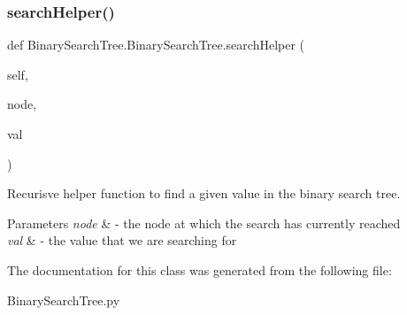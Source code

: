 \subsubsection{\texorpdfstring{search\+Helper()}{searchHelper()}}
{\footnotesize\ttfamily def Binary\+Search\+Tree.\+Binary\+Search\+Tree.\+search\+Helper (\begin{DoxyParamCaption}\item[{}]{self,  }\item[{}]{node,  }\item[{}]{val }\end{DoxyParamCaption})}



Recurisve helper function to find a given value in the binary search tree. 


\begin{DoxyParams}{Parameters}
{\em node} & -\/ the node at which the search has currently reached \\
\hline
{\em val} & -\/ the value that we are searching for \\
\hline
\end{DoxyParams}


The documentation for this class was generated from the following file\+:\begin{DoxyCompactItemize}
\item 
Binary\+Search\+Tree.\+py\end{DoxyCompactItemize}
